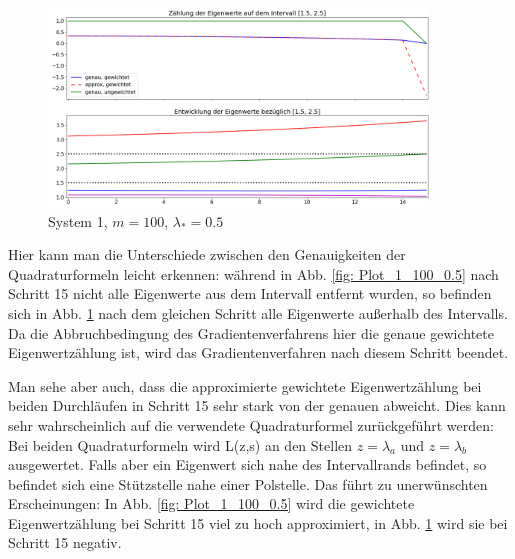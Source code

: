\documentclass[a4paper,12pt]{report}
\newcommand{\1}{\mathds{1}}
\theoremstyle{plain} %
\theoremstyle{definition} %
\theoremstyle{remark}
\begin{document}
            \begin{figure}[h!t]
                  \centering
                  \includegraphics[width=0.9\textwidth, keepaspectratio]{./Original/Plot_1_150_0.5.png}
                  \caption{System 1, $m=100$, $\lambda_*=0.5$}
                  \label{fig: Plot_1_150_0.5}
            \end{figure}

            Hier kann man die Unterschiede zwischen den Genauigkeiten der Quadraturformeln leicht erkennen: während in Abb. \ref{fig: Plot_1_100_0.5}
            nach Schritt 15 nicht alle Eigenwerte aus dem Intervall entfernt wurden, so befinden sich in Abb. \ref{fig: Plot_1_150_0.5} nach dem gleichen Schritt alle Eigenwerte außerhalb des Intervalls.
            Da die Abbruchbedingung des Gradientenverfahrens hier die genaue gewichtete Eigenwertzählung ist, wird das Gradientenverfahren nach diesem Schritt beendet.

            Man sehe aber auch, dass die approximierte gewichtete Eigenwertzählung bei beiden Durchläufen in Schritt 15 sehr stark von der genauen abweicht.
            Dies kann sehr wahrscheinlich auf die verwendete Quadraturformel zurückgeführt werden:
            Bei beiden Quadraturformeln wird L(z,s) an den Stellen $z=\lambda_a$ und $z=\lambda_b$ ausgewertet.
            Falls aber ein Eigenwert sich nahe des Intervallrands befindet, so befindet sich eine Stützstelle nahe einer Polstelle.
            Das führt zu unerwünschten Erscheinungen:
            In Abb. \ref{fig: Plot_1_100_0.5} wird die gewichtete Eigenwertzählung bei Schritt 15 viel zu hoch approximiert,
            in Abb. \ref{fig: Plot_1_150_0.5} wird sie bei Schritt 15 negativ.
\end{document}
